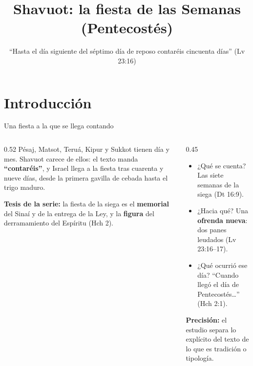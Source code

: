 \documentclass[hyperref={bookmarks=false},aspectratio=169]{beamer}
\title[Shavuot]{\bfseries{Shavuot: la fiesta de las Semanas (Pentecostés)}}
\subtitle{``Hasta el día siguiente del séptimo día de reposo contaréis cincuenta días'' (Lv 23:16)}
\author{}\institute{}\date{}
\newcommand{\destacar}[1]{\textbf{\textcolor{tierraroja}{#1}}}
\newcommand{\precision}[1]{{\footnotesize\color{sepia}\textbf{Precisión:} #1}}
\begin{document}
\frame{\titlepage}


\section{Introducción}

\begin{frame}{Una fiesta a la que se llega contando}
\begin{columns}[c,onlytextwidth]
\begin{column}{0.52\textwidth}\small
Pésaj, Matsot, Teruá, Kipur y Sukkot tienen día y mes. Shavuot carece de ellos: el texto manda \destacar{``contaréis''}, y Israel llega a la fiesta tras cuarenta y nueve días, desde la primera gavilla de cebada hasta el trigo maduro.\par\medskip
\begin{tcolorbox}[colback=papiro,colframe=tierraroja,boxrule=1pt,arc=3pt,left=4pt,right=4pt]
\RaggedRight\small\textbf{Tesis de la serie:} la fiesta de la siega es el \destacar{memorial} del Sinaí y de la entrega de la Ley, y la \destacar{figura} del derramamiento del Espíritu (Hch 2).
\end{tcolorbox}
\end{column}
\begin{column}{0.45\textwidth}\small
\begin{itemize}
\item ¿Qué se cuenta? Las siete semanas de la siega (Dt 16:9).
\item ¿Hacia qué? Una \destacar{ofrenda nueva}: dos panes leudados (Lv 23:16--17).
\item ¿Qué ocurrió ese día? ``Cuando llegó el día de Pentecostés\ldots'' (Hch 2:1).
\end{itemize}\medskip
\precision{el estudio separa lo explícito del texto de lo que es tradición o tipología.}
\end{column}
\end{columns}
\end{frame}
\end{document}

